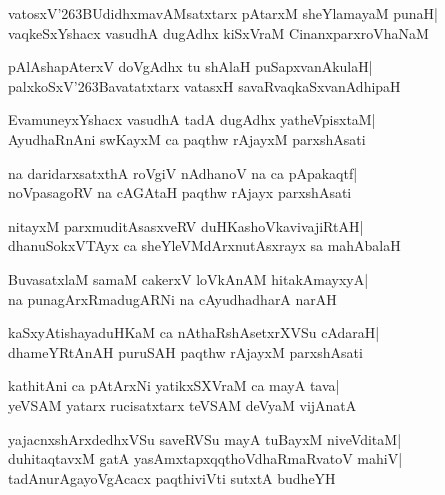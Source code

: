 \documentclass[twoside,12pt,openright]{book}
\def\S{\char'263}
\newcounter{shloka}[chapter]
\begin{document}
\begin{shloka}%
vatosxV\S BUdidhxmavAMsatxtarx pAtarxM sheYlamayaM punaH|\\
vaqkeSxYshacx vasudhA dugAdhx kiSxVraM CinanxparxroVhaNaM
\end{shloka}

\begin{shloka}%
pAlAshapAterxV doVgAdhx tu shAlaH puSapxvanAkulaH|\\
palxkoSxV\S Bavatatxtarx vatasxH savaRvaqkaSxvanAdhipaH
\end{shloka}

\begin{shloka}%
EvamuneyxYshacx vasudhA tadA dugAdhx yatheVpisxtaM|\\
AyudhaRnAni swKayxM ca paqthw rAjayxM parxshAsati
\end{shloka}

\begin{shloka}%
na daridarxsatxthA roVgiV nAdhanoV na ca pApakaqtf|\\
noVpasagoRV na cAGAtaH paqthw rAjayx parxshAsati
\end{shloka}

\begin{shloka}%
nitayxM parxmuditAsasxveRV duHKashoVkavivajiRtAH|\\
dhanuSokxVTAyx ca sheYleVMdArxnutAsxrayx sa mahAbalaH
\end{shloka}

\begin{shloka}%
BuvasatxlaM samaM cakerxV loVkAnAM hitakAmayxyA|\\
na punagArxRmadugARNi na cAyudhadharA narAH
\end{shloka}

\begin{shloka}%
kaSxyAtishayaduHKaM ca nAthaRshAsetxrXVSu cAdaraH|\\
dhameYRtAnAH puruSAH paqthw rAjayxM parxshAsati
\end{shloka}

\begin{shloka}%
kathitAni ca pAtArxNi yatikxSXVraM ca mayA tava|\\
yeVSAM yatarx rucisatxtarx teVSAM deVyaM vijAnatA
\end{shloka}

\begin{shloka}%
yajacnxshArxdedhxVSu saveRVSu mayA tuBayxM niveVditaM|\\
duhitaqtavxM gatA yasAmxtapxqqthoVdhaRmaRvatoV mahiV|\\
tadAnurAgayoVgAcacx paqthiviVti sutxtA budheYH
\end{shloka}
\end{document}
